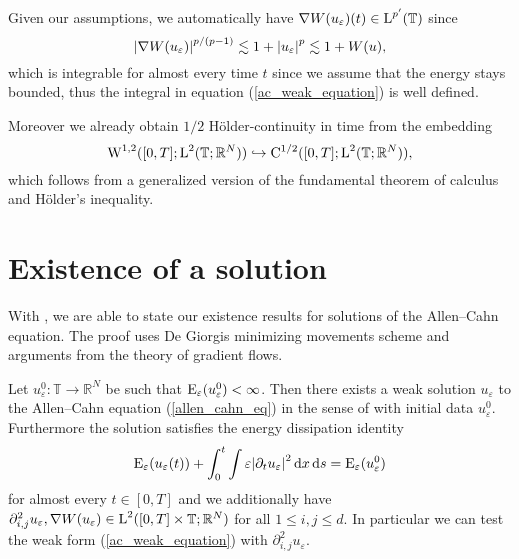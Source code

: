 \begin{remark}
	Given our assumptions, we automatically have $ \nabla W ( u_{ \varepsilon } ) ( t ) \in \operatorname{L}^{ p' } ( \mathbb{ T } ) $ since
	\begin{equation}
		\abs{ \nabla W ( u_{ \varepsilon} ) }^{ p/(p-1) }
		\lesssim
		1+ \abs{u_{ \varepsilon }}^{ p }
		\lesssim
		1 + W ( u ),
	\end{equation}
	which is integrable for almost every time $ t $ since we assume that the energy stays bounded,
	thus the integral in equation (\ref{ac_weak_equation}) is well defined.
	
	Moreover we already obtain $ 1/2 $ Hölder-continuity in time from the embedding
	\begin{equation}
		\operatorname{W}^{ 1 , 2} ( [ 0 , T ] ; \operatorname{L}^{ 2 } ( \mathbb{ T };\mathbb{ R }^{ N } ) )
		\hookrightarrow
		\mathrm{ C }^{ 1/2 } ( [ 0 , T ] ; \operatorname{L}^{ 2 } ( \mathbb{ T } ; \mathbb{ R }^{ N } ) ),
	\end{equation}
	which follows from a generalized version of the fundamental theorem of calculus and Hölder's inequality.
\end{remark}

\section{Existence of a solution}

With , we are able to state our existence results for solutions of the Allen--Cahn equation. The proof uses De Giorgis minimizing movements scheme and arguments from the theory of gradient flows.

\begin{theorem}
	\label{existence_of_ac_solution}
	Let $ u_{ \varepsilon}^{ 0 } \colon \mathbb{ T } \to \mathbb{ R }^{ N } $ be such that 
	$ \operatorname{E}_{ \varepsilon } ( u_{ \varepsilon}^{ 0 } ) < \infty $.
	Then there exists a weak solution $ u_{ \varepsilon} $ to the Allen--Cahn equation (\ref{allen_cahn_eq}) in the sense of  with initial data $ u_{ \varepsilon}^{ 0 } $.
	Furthermore the solution satisfies the energy dissipation identity
	\begin{equation}
		\operatorname{E}_{ \varepsilon } ( u_{ \varepsilon } ( t ) )
		+
		\int_{ 0 }^{ t }
			\int
				\varepsilon \abs{ \partial_{ t } u_{ \varepsilon } }^{ 2 }
			\dd{ x }
		\dd{ s }
		=
		\operatorname{E}_{ \varepsilon } ( u_{ \varepsilon}^{ 0 } )
	\end{equation}
	for almost every $ t \in [ 0 , T ] $ and we additionally have
	$
		\partial_{ i , j }^{ 2 } u_{ \varepsilon }, \nabla W ( u_{ \varepsilon } ) \in \operatorname{L}^{ 2 } ( [0, T] \times \mathbb{ T } ; \mathbb{ R }^{ N } ) 
	$
	for all $ 1 \leq i, j \leq d $. In particular we can test the weak form (\ref{ac_weak_equation}) with $ \partial_{ i , j }^{ 2 } u_{ \varepsilon } $.
\end{theorem}

